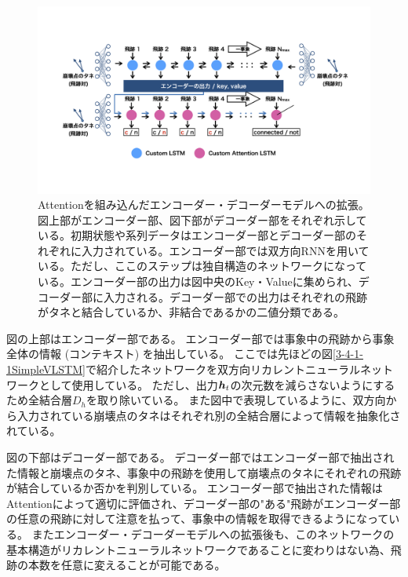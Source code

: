 \begin{figure}[htbp]
 \centering
 \includegraphics[trim = 100 200 100 100, width=1.0\textwidth, clip]{Figure/3Networks/3-4-1-4EncoderDecoderVLSTM.png}
 \caption[Attentionを組み込んだエンコーダー・デコーダーモデルへの拡張]{Attentionを組み込んだエンコーダー・デコーダーモデルへの拡張。図上部がエンコーダー部、図下部がデコーダー部をそれぞれ示している。初期状態や系列データはエンコーダー部とデコーダー部のそれぞれに入力されている。エンコーダー部では双方向RNNを用いている。ただし、ここのステップは独自構造のネットワークになっている。エンコーダー部の出力は図中央のKey・Valueに集められ、デコーダー部に入力される。デコーダー部での出力はそれぞれの飛跡がタネと結合しているか、非結合であるかの二値分類である。}
 \label{3-4-1-4EncoderDecoderVLSTM}
\end{figure}

図の上部はエンコーダー部である。
エンコーダー部では事象中の飛跡から事象全体の情報 (コンテキスト) を抽出している。
ここでは先ほどの図\ref{3-4-1-1SimpleVLSTM}で紹介したネットワークを双方向リカレントニューラルネットワークとして使用している。
ただし、出力${\mbox{\boldmath{$h$}}}_{t}$の次元数を減らさないようにするため全結合層$D_h$を取り除いている。
また図中で表現しているように、双方向から入力されている崩壊点のタネはそれぞれ別の全結合層によって情報を抽象化されている。

図の下部はデコーダー部である。
デコーダー部ではエンコーダー部で抽出された情報と崩壊点のタネ、事象中の飛跡を使用して崩壊点のタネにそれぞれの飛跡が結合しているか否かを判別している。
エンコーダー部で抽出された情報はAttentionによって適切に評価され、デコーダー部の"ある"飛跡がエンコーダー部の任意の飛跡に対して注意を払って、事象中の情報を取得できるようになっている。
またエンコーダー・デコーダーモデルへの拡張後も、このネットワークの基本構造がリカレントニューラルネットワークであることに変わりはない為、飛跡の本数を任意に変えることが可能である。

